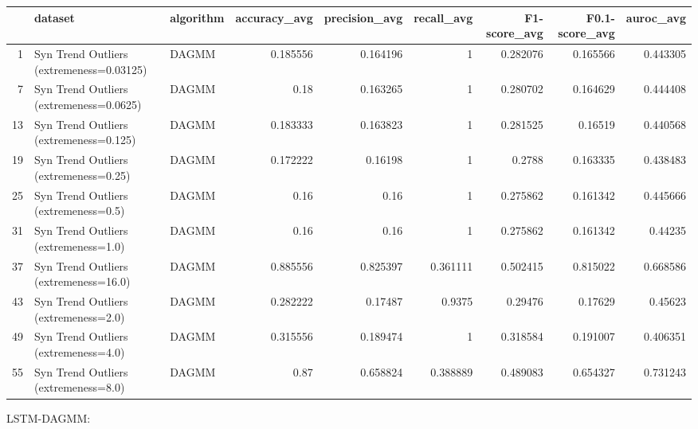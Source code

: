 \begin{tabular}{rllrrrrrr}
\hline
    & dataset                                  & algorithm   &   accuracy\_avg &   precision\_avg &   recall\_avg &   F1-score\_avg &   F0.1-score\_avg &   auroc\_avg \\
\hline
  1 & Syn Trend Outliers (extremeness=0.03125) & DAGMM       &       0.185556 &        0.164196 &     1        &       0.282076 &         0.165566 &    0.443305 \\
  7 & Syn Trend Outliers (extremeness=0.0625)  & DAGMM       &       0.18     &        0.163265 &     1        &       0.280702 &         0.164629 &    0.444408 \\
 13 & Syn Trend Outliers (extremeness=0.125)   & DAGMM       &       0.183333 &        0.163823 &     1        &       0.281525 &         0.16519  &    0.440568 \\
 19 & Syn Trend Outliers (extremeness=0.25)    & DAGMM       &       0.172222 &        0.16198  &     1        &       0.2788   &         0.163335 &    0.438483 \\
 25 & Syn Trend Outliers (extremeness=0.5)     & DAGMM       &       0.16     &        0.16     &     1        &       0.275862 &         0.161342 &    0.445666 \\
 31 & Syn Trend Outliers (extremeness=1.0)     & DAGMM       &       0.16     &        0.16     &     1        &       0.275862 &         0.161342 &    0.44235  \\
 37 & Syn Trend Outliers (extremeness=16.0)    & DAGMM       &       0.885556 &        0.825397 &     0.361111 &       0.502415 &         0.815022 &    0.668586 \\
 43 & Syn Trend Outliers (extremeness=2.0)     & DAGMM       &       0.282222 &        0.17487  &     0.9375   &       0.29476  &         0.17629  &    0.45623  \\
 49 & Syn Trend Outliers (extremeness=4.0)     & DAGMM       &       0.315556 &        0.189474 &     1        &       0.318584 &         0.191007 &    0.406351 \\
 55 & Syn Trend Outliers (extremeness=8.0)     & DAGMM       &       0.87     &        0.658824 &     0.388889 &       0.489083 &         0.654327 &    0.731243 \\
\hline
\end{tabular}

LSTM-DAGMM:


